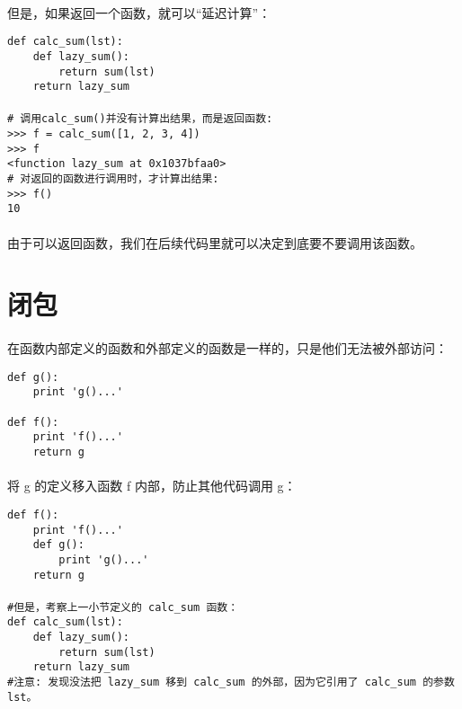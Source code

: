 \documentclass{article}
\begin{document}
\begin{CJK}{UTF8}{gbsn}
\paragraph{}
但是，如果返回一个函数，就可以“延迟计算”：
\begin{verbatim}
def calc_sum(lst):
    def lazy_sum():
        return sum(lst)
    return lazy_sum
\end{verbatim}
\paragraph{}
\begin{verbatim}
# 调用calc_sum()并没有计算出结果，而是返回函数:
>>> f = calc_sum([1, 2, 3, 4])
>>> f
<function lazy_sum at 0x1037bfaa0>
# 对返回的函数进行调用时，才计算出结果:
>>> f()
10
\end{verbatim}
\paragraph{}
由于可以返回函数，我们在后续代码里就可以决定到底要不要调用该函数。
\section{闭包}
\paragraph{}
在函数内部定义的函数和外部定义的函数是一样的，只是他们无法被外部访问：
\begin{verbatim}
def g():
    print 'g()...'

def f():
    print 'f()...'
    return g
\end{verbatim}
\paragraph{}
将 g 的定义移入函数 f 内部，防止其他代码调用 g：
\begin{verbatim}
def f():
    print 'f()...'
    def g():
        print 'g()...'
    return g
\end{verbatim}
\paragraph{}
\begin{verbatim}
#但是，考察上一小节定义的 calc_sum 函数：
def calc_sum(lst):
    def lazy_sum():
        return sum(lst)
    return lazy_sum
#注意: 发现没法把 lazy_sum 移到 calc_sum 的外部，因为它引用了 calc_sum 的参数 lst。
\end{verbatim}

\end{CJK}
\end{document}
